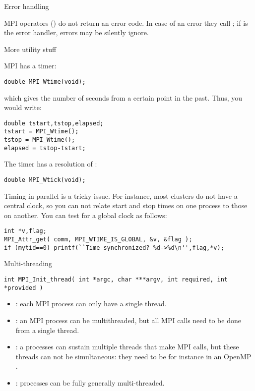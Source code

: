  {Error handling}

MPI operators () do not return an error code. In case of
an error they call ; if 
is the error handler, errors may be silently ignore.

 {More utility stuff}

MPI has a  timer: 
\begin{verbatim}
double MPI_Wtime(void);
\end{verbatim}
which gives the number of seconds from a certain point in the past.
Thus, you would write:
\begin{verbatim}
double tstart,tstop,elapsed;
tstart = MPI_Wtime();
tstop = MPI_Wtime();
elapsed = tstop-tstart;
\end{verbatim}
The timer has a resolution of :
\begin{verbatim}
double MPI_Wtick(void);
\end{verbatim}
Timing in parallel is a tricky issue. For instance, most clusters do
not have a central clock, so you can not relate start and stop times
on one process to those on another. You can test for a global clock as
follows:
\begin{verbatim}
int *v,flag;
MPI_Attr_get( comm, MPI_WTIME_IS_GLOBAL, &v, &flag );
if (mytid==0) printf(``Time synchronized? %d->%d\n'',flag,*v);
\end{verbatim}

 {Multi-threading}

\begin{verbatim}
int MPI_Init_thread( int *argc, char ***argv, int required, int *provided )
\end{verbatim}

\begin{itemize}
\item {}: each MPI process can only have
  a single thread.
\item {}: an MPI process can be
  multithreaded, but all MPI calls need to be done from a single
  thread.
\item {}: a processes can sustain
  multiple threads that make MPI calls, but these threads can not be
  simultaneous: they need to be for instance in an OpenMP
  .
\item {}: processes can be fully
  generally multi-threaded.
\end{itemize}
